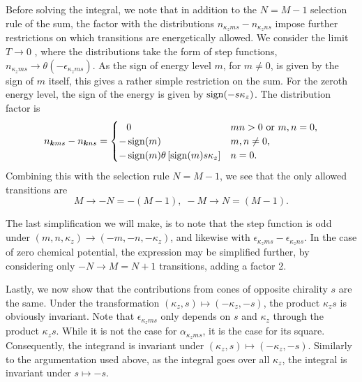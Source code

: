 Before solving the integral, we note that in addition to the  \( N=M-1 \) selection rule of the sum, the factor with the distributions \( n_{\kappa_z m s} - n_{\kappa_z n s} \) impose further restrictions on which transitions are energetically allowed.
We consider the limit \( T \to 0 \) , where the distributions take the form of step functions, \( n_{\kappa_z m s} \to \theta(-\epsilon_{\kappa_z m s}) \).
As the sign of energy level \( m \), for \( m \neq 0 \), is given by the sign of \( m \) itself, this gives a rather simple restriction on the sum.
For the zeroth energy level, the sign of the energy is given by \( \operatorname{sign}(-s\kappa_z) \).
The distribution factor is
\begin{equation}
  \label{eq:92}
  n_{\bm{k} m s} - n_{\bm{k} n s} =
  \begin{cases}
    \phantom{-} 0 & m n > 0 \text{ or  } m,n = 0,\\
    - \operatorname{sign}(m) & m,n \neq 0,\\
    -\operatorname{sign}(m) \theta\left[\operatorname{sign}(m) s \kappa_z\right] & n = 0.
  \end{cases}
\end{equation}
Combining this with the selection rule \( N=M-1 \), we see that the only allowed transitions are
\[ M \to -N = -(M-1), \; -M \to N = (M-1). \]

The last simplification we will make, is to note that the step function is odd under \( (m, n, \kappa_z) \to (-m, -n, -\kappa_z) \), and likewise with \( \epsilon_{\kappa_z m s} - \epsilon_{\kappa_z n s} \).
In the case of zero chemical potential, the expression may be simplified further, by considering only \( -N \to M = N + 1\) transitions, adding a factor 2.

Lastly, we now show that the contributions from cones of opposite chirality \( s \) are the same.
Under the transformation \( (\kappa_z, s) \mapsto (-\kappa_z, -s) \), the product \( \kappa_z s \) is obviously invariant.
Note that \( \epsilon_{\kappa_z m s} \) only depends on \( s \) and \( \kappa_z \) through the product \( \kappa_z s \).
While it is not the case for \( \alpha_{\kappa_z m s} \), it is the case for its square.
Consequently, the integrand is invariant under \( (\kappa_z, s) \mapsto (-\kappa_z, -s) \).
Similarly to the argumentation used above, as the integral goes over all \( \kappa_z \), the integral is invariant under \( s \mapsto -s \).

